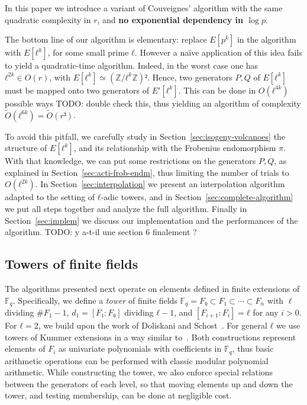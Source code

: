 \documentclass{lms}
\newcommand{\todo}[1]{{\color{red}TODO: #1}}
\newcommand{\F}{\mathbb{F}}
\newcommand{\tildO}{\tilde{O}}
\begin{document}
In this paper we
introduce a variant of Couveignes' algorithm with the same quadratic
complexity in $r$, and \textbf{no exponential dependency in $\log p$}.

The bottom line of our algorithm is elementary: replace $E[p^k]$ in
the algorithm with $E[ℓ^k]$, for some small prime $ℓ$. However a
naïve application of this idea fails to yield a quadratic-time
algorithm. Indeed, in the worst case one has $ℓ^{2k}∈O(r)$, with
$E[ℓ^k]≃(ℤ/ℓ^kℤ)²$. Hence, two generators $P,Q$ of $E[ℓ^k]$ must
be mapped onto two generators of $E'[ℓ^k]$. This can be done in
$O(ℓ^{4k})$ possible ways \todo{double check this}, thus yielding an
algorithm of complexity $\tildO(ℓ^{6k})=\tildO(r³)$.

To avoid this pitfall, we carefully study
in Section~\ref{sec:isogeny-volcanoes} the structure of
$E[ℓ^k]$, and its relationship with the Frobenius endomorphism $π$.
With that knowledge, we can put some restrictions on the generators $P,Q$,
as explained in Section~\ref{sec:acti-frob-endm},
thus limiting the number of trials to $O(ℓ^{2k})$.
In Section~\ref{sec:interpolation}
we present an interpolation algorithm adapted to the setting of
$ℓ$-adic towers, and in Section~\ref{sec:complete-algorithm} we put
all steps together and analyze the full algorithm. Finally in
Section~\ref{sec:implem} we discuss our implementation and the
performances of the algorithm.
\todo{y a-t-il une section 6 finalement ?}



\subsection{Towers of finite fields}
\label{sub:towers}

The algorithms presented next operate on elements defined in finite
extensions of $\F_q$. Specifically, we define a \emph{tower} of finite
fields $\F_q=F₀⊂F₁⊂\cdots⊂F_n$ with $\ell$ dividing $\#F_1-1$, $d_1=[F₁:F₀]$
dividing $ℓ-1$, and $[F_{i+1}:F_i]=ℓ$ for any $i>0$. For $ℓ=2$,
we build upon the work of Doliskani and Schost~\cite{DoSc12}. For
general $ℓ$ we use towers of Kummer extensions in a way similar
to~\cite[\S~2]{DeDoSc13}.  Both constructions represent elements of
$F_i$ as univariate polynomials with coefficients in $\F_q$, thus
basic arithmetic operations can be performed with classic modular
polynomial arithmetic. While constructing the tower, we also enforce
special relations between the generators of each level, so that moving
elements up and down the tower, and testing membership, can be done at
negligible cost.
\end{document}
